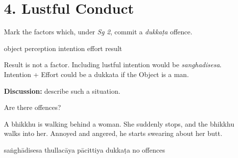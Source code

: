 \chapter{4. Lustful Conduct}
\renewcommand*{\theChapterTitle}{4. Lustful Conduct}

\begin{exam}{\autoExamName}

\begin{problem*}

  \begin{parts}

  \item Mark the factors which, under \textit{Sg 2}, commit a \textit{dukkaṭa} offence.

    \bigskip

    \begin{answers}{6}
      \bChoices
       object\eAns
       perception\eAns
       intention\eAns
       effort\eAns
       result\eAns
      \eChoices
    \end{answers}

    \bigskip

    \begin{solution}
      Result is not a factor.
      Including lustful intention would be \emph{sanghadisesa}.
      Intention + Effort could be a dukkata if the Object is a man.
    \end{solution}

    \textbf{Discussion:} describe such a situation.

  \end{parts}

\end{problem*}

\problemDivide

\begin{problem*}

  Are there offences?

  \begin{parts}

  \item
    A bhikkhu is walking behind a woman. She suddenly stops, and the bhikkhu walks
    into her. Annoyed and angered, he starts swearing about her butt.

    \bigskip

    \begin{answers}{5}
      \bChoices
       saṅghādisesa\eAns
       thullacāya\eAns
       pācittiya\eAns
       dukkaṭa\eAns
       no offences\eAns
      \eChoices
    \end{answers}


\end{parts}
\end{problem*}
\end{exam}
